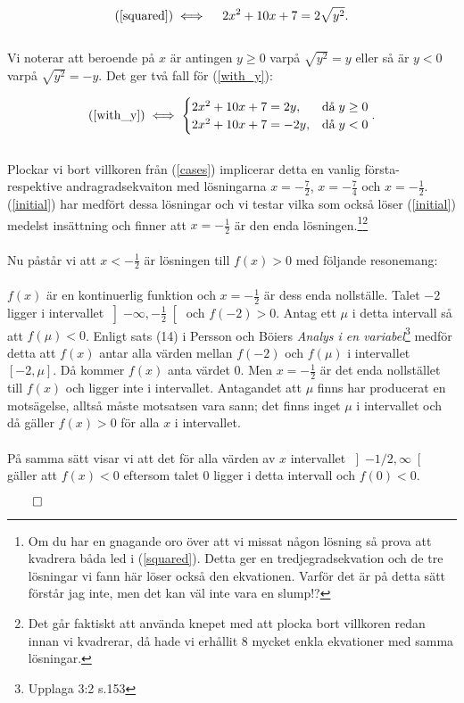 \documentclass{article}
\begin{document}
\begin{gather}
  \text{(\ref{squared})} \iff \quad 2x^2 + 10x + 7 = 2\sqrt{y^2}\text{.} \label{with_y}
\end{gather}
\\
Vi noterar att beroende på $x$ är antingen $y \geq 0$ varpå $\sqrt{y^{2}} = y$ eller så är $y < 0$ varpå $\sqrt{y^{2}} = -y$. Det ger två fall för (\ref{with_y}):

\begin{align}
  \text{(\ref{with_y})} \iff
  \begin{cases}
    2x^{2} + 10x + 7 = 2y, & \text{då}\; y \geq 0 \\
    2x^{2} + 10x + 7 = -2y, & \text{då}\; y < 0
  \end{cases}\text{.} \label{cases}
\end{align}
\\
Plockar vi bort villkoren från (\ref{cases}) implicerar detta en vanlig första- respektive andragradsekvaiton med lösningarna $x = -\tfrac{7}{2}$, $x = -\tfrac{7}{4}$ och $x = -\tfrac{1}{2}$. (\ref{initial}) har medfört dessa lösningar och vi testar vilka som också löser (\ref{initial}) medelst insättning och finner att $x = -\tfrac{1}{2}$ är den enda lösningen.\footnote{Om du har en gnagande oro över att vi missat någon lösning så prova att kvadrera båda led i (\ref{squared}). Detta ger en tredjegradsekvation och de tre lösningar vi fann här löser också den ekvationen. Varför det är på detta sätt förstår jag inte, men det kan väl inte vara en slump!?}\footnote{Det går faktiskt att använda knepet med att plocka bort villkoren redan innan vi kvadrerar, då hade vi erhållit 8 mycket enkla ekvationer med samma lösningar.}
\\
\\
Nu påstår vi att $x < -\tfrac{1}{2}$ är lösningen till $f(x) > 0$ med följande resonemang:
\\
\\
$f(x)$ är en kontinuerlig funktion och $x = -\tfrac{1}{2}$ är dess enda nollställe. Talet $-2$ ligger i intervallet $\left]-\infty, -\tfrac{1}{2}\right[$ och $f(-2) > 0$. Antag ett $\mu$ i detta intervall så att $f(\mu) < 0$. Enligt sats (14) i Persson och Böiers \emph{Analys i en variabel}\footnote{Upplaga 3:2 s.153} medför detta att $f(x)$ antar alla värden mellan $f(-2)$ och $f(\mu)$ i intervallet $\left[-2, \mu\right]$. Då kommer $f(x)$ anta värdet $0$. Men $x = -\tfrac{1}{2}$ är det enda nollstället till $f(x)$ och ligger inte i intervallet. Antagandet att $\mu$ finns har producerat en motsägelse, alltså måste motsatsen vara sann; det finns inget $\mu$ i intervallet och då gäller $f(x) > 0$ för alla $x$ i intervallet.
\\
\\På samma sätt visar vi att det för alla värden av $x$ intervallet $ \left]-1/2, \infty\right[$ gäller att $f(x) < 0$ eftersom talet $0$ ligger i detta intervall och $f(0) < 0$.

\centerline{$\qed$}
\end{document}

